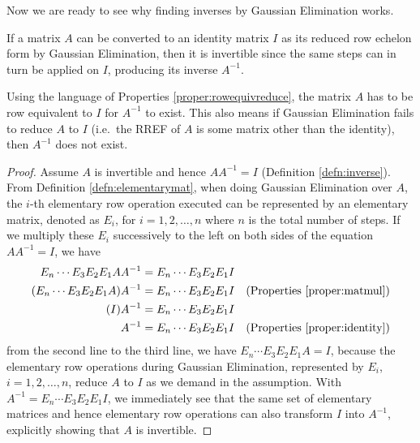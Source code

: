 Now we are ready to see why finding inverses by Gaussian Elimination works.
\begin{thm}
\label{thm:Gausselimprincip}
If a matrix $A$ can be converted to an identity matrix $I$ as its reduced row echelon form by Gaussian Elimination, then it is invertible since the same steps can in turn be applied on $I$, producing its inverse $A^{-1}$. 
\end{thm}
Using the language of Properties \ref{proper:rowequivreduce}, the matrix $A$ has to be row equivalent to $I$ for $A^{-1}$ to exist. This also means if Gaussian Elimination fails to reduce $A$ to $I$ (i.e.\ the RREF of $A$ is some matrix other than the identity), then $A^{-1}$ does not exist.
\begin{proof}
Assume $A$ is invertible and hence $AA^{-1} = I$ (Definition \ref{defn:inverse}). From Definition \ref{defn:elementarymat}, when doing Gaussian Elimination over $A$, the $i$-th elementary row operation executed can be represented by an elementary matrix, denoted as $E_{i}$, for $i = 1,2,\ldots,n$ where $n$ is the total number of steps. If we multiply these $E_{i}$ successively to the left on both sides of the equation $AA^{-1} = I$, we have
\begin{align*}
E_n \cdots E_{3}E_{2}E_{1} AA^{-1} &= E_n \cdots E_{3}E_{2}E_{1}I \\
(E_n \cdots E_{3}E_{2}E_{1}A) A^{-1} &= E_n \cdots E_{3}E_{2}E_{1}I & \text{(Properties \ref{proper:matmul})} \\
(I)A^{-1} &= E_n \cdots E_{3}E_{2}E_{1}I \\
A^{-1} &= E_n \cdots E_{3}E_{2}E_{1}I & \text{(Properties \ref{proper:identity})}
\end{align*}
from the second line to the third line, we have $E_n \cdots E_{3}E_{2}E_{1}A = I$, because the elementary row operations during Gaussian Elimination, represented by $E_i$, $i = 1,2,\ldots,n$, reduce $A$ to $I$ as we demand in the assumption. With $A^{-1} = E_n \cdots E_{3}E_{2}E_{1}I$, we immediately see that the same set of elementary matrices and hence elementary row operations can also transform $I$ into $A^{-1}$, explicitly showing that $A$ is invertible.    
\end{proof}

